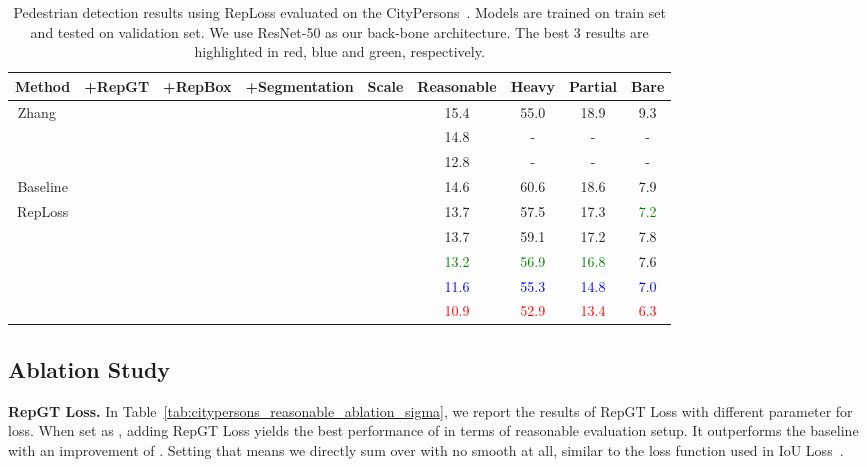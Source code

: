 \documentclass[10pt,twocolumn,letterpaper]{article}
\newcommand{\myparagraph}[1]{{\vspace{0.5em} \noindent \bf #1}}
\begin{document}
\begin{table*}[!ht]
\begin{center}
 		\begin{tabular}{c|cccc|c|ccc}
 		\hline\hline
 		Method & +RepGT & +RepBox & +Segmentation & Scale & Reasonable & Heavy & Partial & Bare\\
 		\hline\hline
 		\multirow{3}{*}{Zhang \etal~\cite{zhang2017citypersons}} & & & &  & 15.4 & 55.0 & 18.9 & 9.3 \\
 		& & &  &  & 14.8 & - & - & - \\
 		& & & &  & 12.8 & - & - & -\\
 		\hline
 		Baseline & & & &  & 14.6 & 60.6 & 18.6 & 7.9 \\
 		\hline
 		RepLoss &  & & &  & 13.7 & 57.5 & 17.3 & \textcolor{green}{7.2} \\
 		& &  & &  & 13.7 & 59.1 & 17.2 & 7.8 \\
 		&  &   & &  & \textcolor{green}{13.2} & \textcolor{green}{56.9} & \textcolor{green}{16.8} & 7.6 \\
 		&  &   & &  & \textcolor{blue}{11.6} & \textcolor{blue}{55.3}  & \textcolor{blue}{14.8} & \textcolor{blue}{7.0} \\
 		&  &   & &  & \textcolor{red}{10.9} & \textcolor{red}{52.9}  & \textcolor{red}{13.4} & \textcolor{red}{6.3} \\
 		\end{tabular}
 	\end{center}
 	\caption{Pedestrian detection results using RepLoss evaluated on the CityPersons~\cite{zhang2017citypersons}. Models are trained on train set and tested on validation set. We use ResNet-50 as our back-bone architecture. The best 3 results are highlighted in red, blue and green, respectively.}
 	\label{tab:citypersons_results}
\end{table*}

\subsection{Ablation Study}
\label{subsec:ablationexperiments}

\myparagraph{RepGT Loss.} In Table~\ref{tab:citypersons_reasonable_ablation_sigma}, we report the results of RepGT Loss with different parameter  for  loss. When set  as , adding RepGT Loss yields the best performance of   in terms of reasonable evaluation setup. It outperforms the baseline with an improvement of  . Setting  that means we directly sum over  with no smooth at all, similar to the loss function used in IoU Loss~\cite{yu2016unitbox}.
\end{document}

